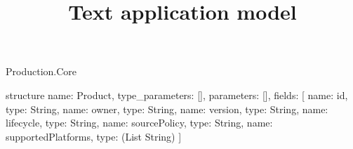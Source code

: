\begin{lexlean}{Production.Core}
\title{Text application model}
\begin{semanticmodule}
structure{
  name: Product,
  type_parameters: [],
  parameters: [],
  fields: [
    {name: id, type: String},
    {name: owner, type: String},
    {name: version, type: String},
    {name: lifecycle, type: String},
    {name: sourcePolicy, type: String},
    {name: supportedPlatforms, type: (List String)}
  ]
}
\end{semanticmodule}
\end{lexlean}
